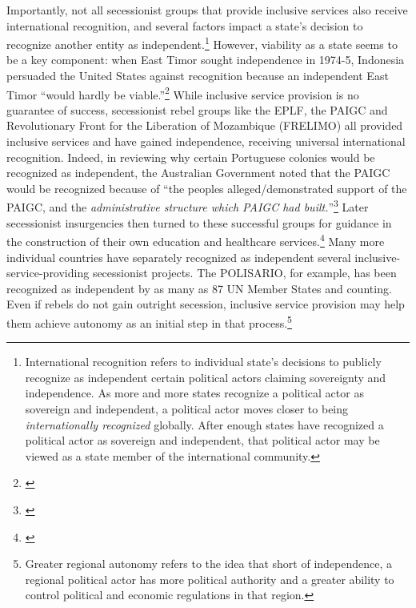 \documentclass[12pt, letterpaper]{article}
\begin{document}

Importantly, not all secessionist groups that provide inclusive services also receive international recognition, and several factors impact a state's decision to recognize another entity as independent.\footnote{International recognition refers to individual state's decisions to publicly recognize as independent certain political actors claiming sovereignty and independence. As more and more states recognize a political actor as sovereign and independent, a political actor moves closer to being \textit{internationally recognized} globally. After enough states have recognized a political actor as sovereign and independent, that political actor may be viewed as a state member of the international community.} However, viability as a state seems to be a key component: when East Timor sought independence in 1974-5, Indonesia persuaded the United States against recognition because an independent East Timor ``would hardly be viable.''\footnote{\citealt[6]{nsadoc}} While inclusive service provision is no guarantee of success, secessionist rebel groups like the EPLF, the PAIGC and Revolutionary Front for the Liberation of Mozambique (FRELIMO) all provided inclusive services and have gained independence, receiving universal international recognition. Indeed, in reviewing why certain Portuguese colonies would be recognized as independent, the Australian Government noted that the PAIGC would be recognized  because of ``the peoples alleged/demonstrated support of the PAIGC, and the \textit{administrative structure which PAIGC had built.}''\footnote{\citealt[240, emphasis added]{memo1975}} Later secessionist insurgencies then turned to these successful groups for guidance in the construction of their own education and healthcare services.\footnote{\citealt{da2010amilcar}} Many more individual countries have separately recognized as independent several inclusive-service-providing secessionist projects. The POLISARIO, for example, has been recognized as independent by as many as 87 UN Member States and counting. Even if rebels do not gain outright secession, inclusive service provision may help them achieve autonomy as an initial step in that process.\footnote{Greater regional autonomy refers to the idea that short of independence, a regional political actor has more political authority and a greater ability to control political and economic regulations in that region.} 
\end{document}
